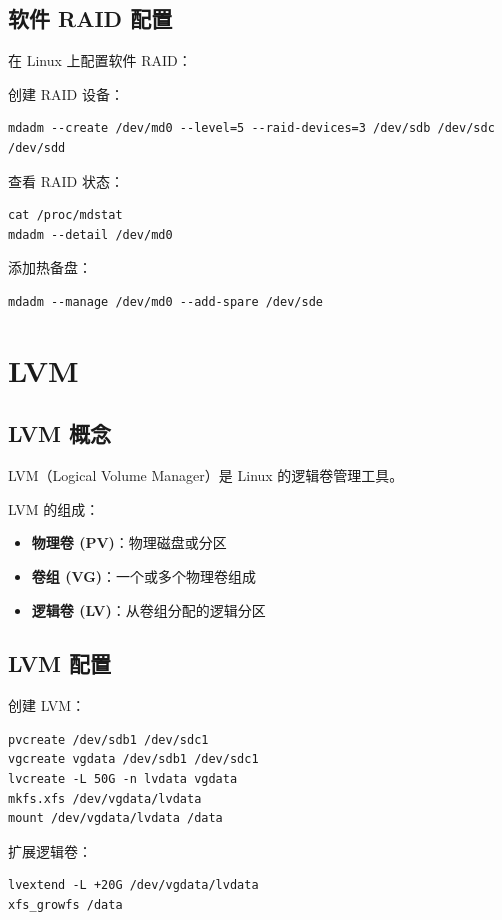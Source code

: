 \documentclass[12pt,UTF8]{ctexbook}
\begin{document}
\section{软件 RAID 配置}
\label{sec:software_raid}

在 Linux 上配置软件 RAID：

创建 RAID 设备：
\begin{verbatim}
mdadm --create /dev/md0 --level=5 --raid-devices=3 /dev/sdb /dev/sdc /dev/sdd
\end{verbatim}

查看 RAID 状态：
\begin{verbatim}
cat /proc/mdstat
mdadm --detail /dev/md0
\end{verbatim}

添加热备盘：
\begin{verbatim}
mdadm --manage /dev/md0 --add-spare /dev/sde
\end{verbatim}

\chapter{LVM}
\label{chap:lvm}

\section{LVM 概念}
\label{sec:lvm_concept}

LVM（Logical Volume Manager）是 Linux 的逻辑卷管理工具。

LVM 的组成：
\begin{itemize}
    \item \textbf{物理卷 (PV)}：物理磁盘或分区
    \item \textbf{卷组 (VG)}：一个或多个物理卷组成
    \item \textbf{逻辑卷 (LV)}：从卷组分配的逻辑分区
\end{itemize}

\section{LVM 配置}
\label{sec:lvm_config}

创建 LVM：
\begin{verbatim}
pvcreate /dev/sdb1 /dev/sdc1
vgcreate vgdata /dev/sdb1 /dev/sdc1
lvcreate -L 50G -n lvdata vgdata
mkfs.xfs /dev/vgdata/lvdata
mount /dev/vgdata/lvdata /data
\end{verbatim}

扩展逻辑卷：
\begin{verbatim}
lvextend -L +20G /dev/vgdata/lvdata
xfs_growfs /data
\end{verbatim}
\end{document}
